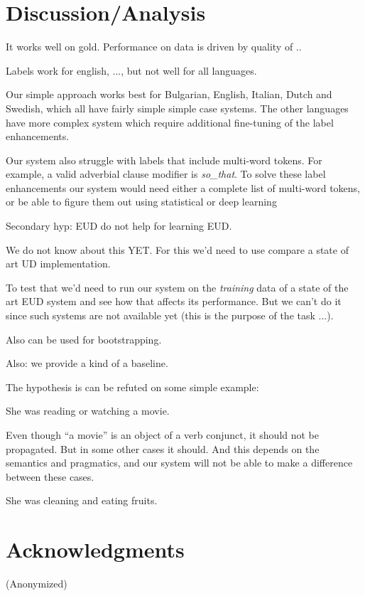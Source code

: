 \documentclass[11pt,a4paper]{article}
\begin{document}
    
\section{Discussion/Analysis}


It works well on gold.
Performance on data is driven by quality of ..

Labels work for english, ...,  but not well for all languages.

Our simple approach works best for Bulgarian, English, Italian,
Dutch and Swedish, which all have fairly simple simple case
systems. The other languages have more complex system which
require additional fine-tuning of the label enhancements.

Our system also struggle with labels that include multi-word
tokens. For example, a valid adverbial clause modifier is
\textit{so\_that}. To solve these label enhancements our system
would need either a complete list of multi-word tokens, or be
able to figure them out using statistical or deep learning    
    
    
Secondary hyp: EUD do not help for learning EUD.

We do not know about this YET. For this we'd need to use compare a
state of art UD implementation.


To test that we'd need to run our system on the \emph{training} data
of a state of the art EUD system and see how that affects its
performance. But we can't do it since such systems are not available
yet (this is the purpose of the task ...).

Also can be used for bootstrapping.

Also: we provide a kind of a baseline.

The hypothesis is can be refuted on some simple example:

She was reading or watching a movie.

Even though ``a movie'' is an object of a verb conjunct, it should not
be propagated. But in some other cases it should. And this depends on
the semantics and pragmatics, and our system will not be able to make
a difference between these cases.

She was cleaning and eating fruits.


    
\section*{Acknowledgments}

(Anonymized)



\end{document}
